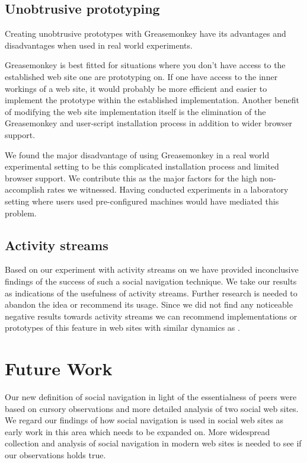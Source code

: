 \subsection{Unobtrusive prototyping}

Creating unobtrusive prototypes with Greasemonkey have its advantages and
disadvantages when used in real world experiments.

Greasemonkey is best fitted for situations where you don't have access to the
established web site one are prototyping on. If one have access to the inner
workings of a web site, it would probably be more efficient and easier to
implement the prototype within the established implementation. Another benefit
of modifying the web site implementation itself is the elimination of the
Greasemonkey and user-script installation process in addition to wider browser
support.

We found the major disadvantage of using Greasemonkey in a real world
experimental setting to be this complicated installation process and limited
browser support. We contribute this as the major factors for the high
non-accomplish rates we witnessed. Having conducted experiments in a
laboratory setting where users used pre-configured machines would have
mediated this problem.

\subsection{Activity streams}

Based on our experiment with activity streams on \urort{} we have provided
inconclusive findings of the success of such a social navigation technique.
We take our results as indications of the usefulness of activity streams.
Further research is needed to abandon the idea or recommend its usage.
Since we did not find any noticeable negative results towards activity streams
we can recommend implementations or prototypes of this feature in web sites
with similar dynamics as \urort{}.

\section{Future Work}

Our new definition of social navigation in light of the essentialness of peers
were based on cursory observations and more detailed analysis of two social
web sites. We regard our findings of how social navigation is used in social
web sites as early work in this area which needs to be expanded on. More
widespread collection and analysis of social navigation in modern web sites is
needed to see if our observations holds true.

